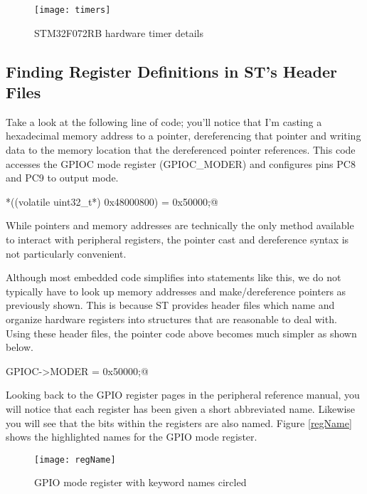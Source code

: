 \documentclass[11pt,fleqn]{book} %
\makeatletter
\newcommand{\ilcode}[1]{
    \smallskip
    \colorbox{gray!20!white}{
        \centering
        \parbox{\linewidth-2\fboxsep}{
            \lstinline@#1@
        }
    }
}
\makeatother
\begin{document}
\begin{figure}[]
    \centering\texttt{[image: timers]}
    \caption{STM32F072RB hardware timer details}
    \label{timers}
\end{figure}

\subsection{Finding Register Definitions in ST's Header Files}

Take a look at the following line of code; you'll notice that I'm casting a hexadecimal memory address to a pointer, dereferencing that pointer and writing data to the memory location that the dereferenced pointer references. This code accesses the GPIOC mode register (GPIOC\_MODER) and configures pins PC8 and PC9 to output mode.

\ilcode{*((volatile uint32\_t*) 0x48000800) = 0x50000;}%
\smallskip

While pointers and memory addresses are technically the only method available to interact with peripheral registers, the pointer cast and dereference syntax is not particularly convenient.

Although most embedded code simplifies into statements like this, we do not typically have to look up memory addresses and make/dereference pointers as previously shown. This is because ST provides header files which name and organize hardware registers into structures that are reasonable to deal with. Using these header files, the pointer code above becomes much simpler as shown below.

\ilcode{GPIOC->MODER = 0x50000;}%
\smallskip


Looking back to the GPIO register pages in the peripheral reference manual, you will notice that each register has been given a short abbreviated name. Likewise you will see that the bits within the registers are also named. Figure \vref{regName} shows the highlighted names for the GPIO mode register. 

\begin{figure}[]
    \centering\texttt{[image: regName]}
    \caption{GPIO mode register with keyword names circled}
    \label{regName}
\end{figure}
\end{document}
